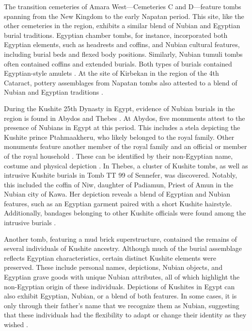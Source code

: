 The transition cemeteries of Amara West—Cemeteries C and D—feature tombs spanning from the New Kingdom to the early Napatan period. This site, like the other cemeteries in the region, exhibits a similar blend of Nubian and Egyptian burial traditions. Egyptian chamber tombs, for instance, incorporated both Egyptian elements, such as headrests and coffins, and Nubian cultural features, including burial beds and flexed body positions. Similarly, Nubian tumuli tombs often contained coffins and extended burials. Both types of burials contained Egyptian-style amulets \parencites{spencerAmaraWestII2002}{binder10th9thCenturyBC2011}. At the site of Kirbekan in the region of the 4th Cataract, pottery assemblages from Napatan tombs also attested to a blend of Nubian and Egyptian traditions \parencite{budkaDocumentationExcavationDome2007}.

During the Kushite 25th Dynasty in Egypt, evidence of Nubian burials in the region is found in Abydos and Thebes \parencites{budkaKuschitenAbydosEinige2012}{budkaNubians1stMillennium2019}. At Abydos, five monuments attest to the presence of Nubians in Egypt at this period. This includes a stela depicting the Kushite prince Ptahmaakheru, who likely belonged to the royal family. Other monuments feature another member of the royal family and an official or member of the royal household \parencite{leahyKushitesAbydosRoyal2014}. These can be identified by their non-Egyptian name, costume and physical depiction \parencite[p.~704-705]{budkaNubians1stMillennium2019}. In Thebes, a cluster of Kushite tombs, as well as intrusive Kushite burials in Tomb TT 99 of Sennefer, was discovered. Notably, this included the coffin of Niw, daughter of Padiamun, Priest of Amun in the Nubian city of Kawa. Her depiction reveals a blend of Egyptian and Nubian features, such as an Egyptian garment paired with a short Kushite hairstyle. Additionally, bandages belonging to other Kushite officials were found among the intrusive burials \parencite[p.~504-505]{budkaKushiteTombGroups2010}.

Another tomb, featuring a mud brick superstructure, contained the remains of several individuals of Kushite ancestry. Although much of the burial assemblage reflects Egyptian characteristics, certain distinct Kushite elements were preserved. These include personal names, depictions, Nubian objects, and Egyptian grave goods with unique Nubian attributes, all of which highlight the non-Egyptian origin of these individuals. Depictions of Kushites in Egypt can also exhibit Egyptian, Nubian, or a blend of both features. In some cases, it is only through their father's name that we recognize them as Nubian, suggesting that these individuals had the flexibility to adapt or change their identity as they wished \parencites{budkaKushiteTombGroups2010, budkaNubians1stMillennium2019, budkaNubiansEgypt25th2020}.

